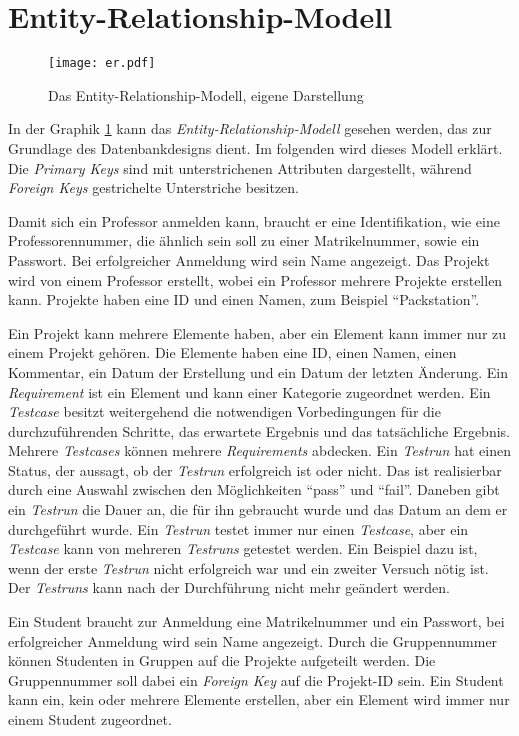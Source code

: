 \documentclass[11pt,a4paper]{report}
\begin{document}
\section{Entity-Relationship-Modell} \label{s:erm}

\begin{figure}[htpb]
  \centering
  \texttt{[image: er.pdf]}
  \caption{Das Entity-Relationship-Modell, eigene Darstellung}
  \label{f:erd}
\end{figure}


In der Graphik \ref{f:erd} kann das \textit{Entity-Relationship-Modell} gesehen werden, das zur Grundlage des Datenbankdesigns dient. Im folgenden wird dieses Modell erklärt. Die \textit{Primary Keys} sind mit unterstrichenen Attributen dargestellt, während \textit{Foreign Keys} gestrichelte Unterstriche besitzen.


Damit sich ein Professor anmelden kann, braucht er eine Identifikation, wie eine Professorennummer, die ähnlich sein soll zu einer Matrikelnummer, sowie ein Passwort. Bei erfolgreicher Anmeldung wird sein Name angezeigt. Das Projekt wird von einem Professor erstellt, wobei ein Professor mehrere Projekte erstellen kann. Projekte haben eine ID und einen Namen, zum Beispiel "`Packstation"'. 

Ein Projekt kann mehrere Elemente haben, aber ein Element kann immer nur zu einem Projekt gehören. Die Elemente haben eine ID, einen Namen, einen Kommentar, ein Datum der Erstellung und ein Datum der letzten Änderung. Ein \textit{Requirement} ist ein Element und kann einer Kategorie zugeordnet werden. Ein \textit{Testcase} besitzt weitergehend die notwendigen Vorbedingungen für die durchzuführenden Schritte, das erwartete Ergebnis und das tatsächliche Ergebnis. Mehrere \textit{Testcases} können mehrere \textit{Requirements} abdecken. Ein \textit{Testrun} hat einen Status, der aussagt, ob der \textit{Testrun} erfolgreich ist oder nicht. Das ist realisierbar durch eine Auswahl zwischen den Möglichkeiten "`pass"' und "`fail"'. Daneben gibt ein \textit{Testrun} die Dauer an, die für ihn gebraucht wurde und das Datum an dem er durchgeführt wurde. Ein \textit{Testrun} testet immer nur einen \textit{Testcase}, aber ein \textit{Testcase} kann von mehreren \textit{Testruns} getestet werden. Ein Beispiel dazu ist, wenn der erste \textit{Testrun} nicht erfolgreich war und ein zweiter Versuch nötig ist. Der \textit{Testruns} kann nach der Durchführung nicht mehr geändert werden.

Ein Student braucht zur Anmeldung eine Matrikelnummer und ein Passwort, bei erfolgreicher Anmeldung wird sein Name angezeigt. Durch die Gruppennummer können Studenten in Gruppen auf die Projekte aufgeteilt werden. Die Gruppennummer soll dabei ein \textit{Foreign Key} auf die Projekt-ID sein. Ein Student kann ein, kein oder mehrere Elemente erstellen, aber ein Element wird immer nur einem Student zugeordnet.
\end{document}
